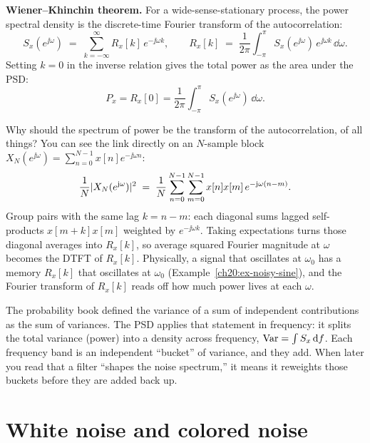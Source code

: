 \begin{formalbox}
\textbf{Wiener--Khinchin theorem.} For a wide-sense-stationary process, the power
spectral density is the discrete-time Fourier transform of the autocorrelation:
\begin{equation}
  S_x(e^{\jj\omega}) \;=\; \sum_{k=-\infty}^{\infty} R_x[k]\,e^{-\jj\omega k},
  \qquad
  R_x[k] \;=\; \frac{1}{2\pi}\int_{-\pi}^{\pi} S_x(e^{\jj\omega})\,e^{\jj\omega k}\,\dd\omega.
  \label{ch20:wk}
\end{equation}
Setting $k=0$ in the inverse relation gives the total power as the area under the
PSD:
\[
  P_x = R_x[0] = \frac{1}{2\pi}\int_{-\pi}^{\pi} S_x(e^{\jj\omega})\,\dd\omega.
\]
\end{formalbox}

\begin{whybox}
Why should the spectrum of power be the transform of the autocorrelation, of all
things? You can see the link directly on an $N$-sample block $X_N(e^{\jj\omega}) = \sum_{n=0}^{N-1} x[n]e^{-\jj\omega n}$:
\[
  \frac{1}{N}\lvert X_N(e^{\mathrm{j}\omega})\rvert^2 \;=\; \frac{1}{N}\sum_{n=0}^{N-1}\sum_{m=0}^{N-1} x[n]x[m]\,e^{-\mathrm{j}\omega(n-m)}.
\]
Group pairs with the same lag $k = n - m$: each diagonal sums lagged self-products $x[m+k]x[m]$ weighted by $e^{-\jj\omega k}$. Taking expectations turns those diagonal averages into $R_x[k]$, so average squared Fourier magnitude at $\omega$ becomes the DTFT of $R_x[k]$. Physically, a signal that oscillates at $\omega_0$ has a memory $R_x[k]$ that oscillates at $\omega_0$ (Example~\ref{ch20:ex-noisy-sine}), and the Fourier transform of $R_x[k]$ reads off how much power lives at each $\omega$.
\end{whybox}

\begin{connectionbox}
The probability book defined the variance of a sum of independent contributions
as the sum of variances. The PSD applies that statement in frequency: it splits the
total variance (power) into a density across frequency, $\operatorname{Var} = \int S_x\,\mathrm{d} f$.
Each frequency band is an independent ``bucket'' of variance, and they add. When
later you read that a filter ``shapes the noise spectrum,'' it means it
reweights those buckets before they are added back up.
\end{connectionbox}

\section{White noise and colored noise}
\label{ch20:white-colored}

